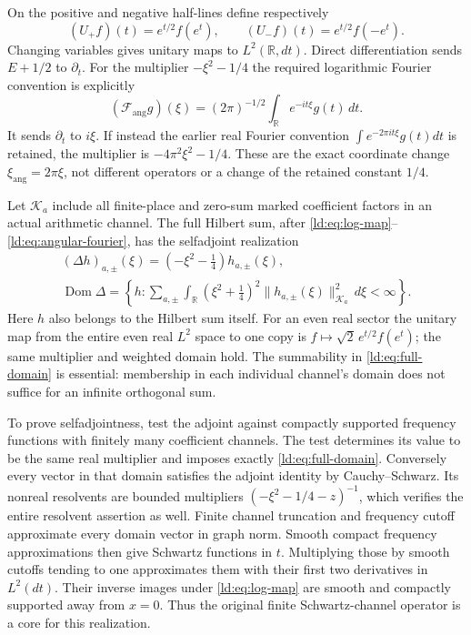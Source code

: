 \documentclass[11pt,a4paper]{article}
\theoremstyle{definition}\newtheorem{definition}[theorem]{Definition}
\providecommand{\Dom}{\operatorname{Dom}}
\begin{document}
On the positive and negative half-lines define respectively
\[
 (U_+f)(t)=e^{t/2}f(e^t),\qquad
 (U_-f)(t)=e^{t/2}f(-e^t).
 \tag{LD6}\label{ld:eq:log-map}
\]
Changing variables gives unitary maps to $L^2(\mathbb R,dt)$.
Direct differentiation sends $E+1/2$ to $\partial_t$.
For the multiplier $-\xi^2-1/4$ the required logarithmic Fourier
convention is explicitly
\[
 (\mathcal F_{\mathrm{ang}}g)(\xi)
    =(2\pi)^{-1/2}\int_{\mathbb R}e^{-it\xi}g(t)\,dt.
 \tag{LD7}\label{ld:eq:angular-fourier}
\]
It sends $\partial_t$ to $i\xi$. If instead the earlier real
Fourier convention $\int e^{-2\pi it\xi}g(t)dt$ is retained,
the multiplier is $-4\pi^2\xi^2-1/4$. These are the exact
coordinate change $\xi_{\mathrm{ang}}=2\pi\xi$, not different
operators or a change of the retained constant $1/4$.

Let $\mathscr K_a$ include all finite-place and zero-sum marked
coefficient factors in an actual arithmetic channel. The full
Hilbert sum, after \eqref{ld:eq:log-map}--\eqref{ld:eq:angular-fourier},
has the selfadjoint realization
\[
 \begin{gathered}
 (\Delta h)_{a,\pm}(\xi)=(-\xi^2-\tfrac14)h_{a,\pm}(\xi),\\
 \Dom\Delta=\left\{h:
   \sum_{a,\pm}\int_{\mathbb R}
    (\xi^2+\tfrac14)^2\|h_{a,\pm}(\xi)\|_{\mathscr K_a}^2
           \,d\xi<\infty\right\}.
 \end{gathered}
 \tag{LD8}\label{ld:eq:full-domain}
\]
Here $h$ also belongs to the Hilbert sum itself. For an even
real sector the unitary map from the entire even real $L^2$
space to one copy is $f\mapsto\sqrt2\,e^{t/2}f(e^t)$;
the same multiplier
and weighted domain hold. The summability in
\eqref{ld:eq:full-domain} is essential: membership in each individual
channel's domain does not suffice for an infinite orthogonal sum.

To prove selfadjointness, test the adjoint against compactly
supported frequency functions with finitely many coefficient
channels. The test determines its value to be the same real
multiplier and imposes exactly \eqref{ld:eq:full-domain}.
Conversely every vector in that domain satisfies the adjoint
identity by Cauchy--Schwarz. Its nonreal resolvents are bounded
multipliers $(-\xi^2-1/4-z)^{-1}$, which verifies the entire
resolvent assertion as well. Finite channel truncation and
frequency cutoff approximate every domain vector in graph norm.
Smooth compact frequency approximations then give Schwartz
functions in $t$. Multiplying those by smooth cutoffs tending
to one approximates them with their first two derivatives in
$L^2(dt)$. Their inverse images under \eqref{ld:eq:log-map} are
smooth and compactly supported away from $x=0$. Thus the original
finite Schwartz-channel operator is a core for this realization.
\end{document}
